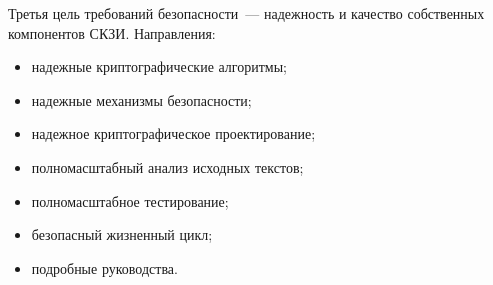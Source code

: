 Третья цель требований безопасности~--- надежность и качество собственных 
компонентов СКЗИ.
%
Направления:
\begin{itemize}
\item 
надежные криптографические алгоритмы;
\item 
надежные механизмы безопасности;
\item 
надежное криптографическое проектирование;
\item 
полномасштабный анализ исходных текстов;
\item 
полномасштабное тестирование;
\item 
безопасный жизненный цикл;
\item 
подробные руководства.
\end{itemize}
